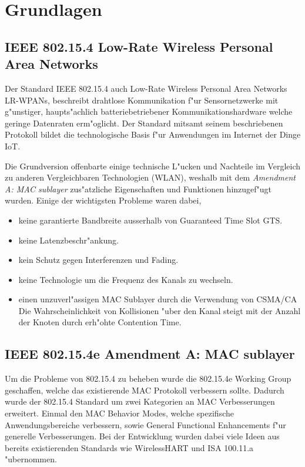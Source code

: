\section{Grundlagen} \label{grundlagen}

\subsection{IEEE 802.15.4 Low-Rate Wireless Personal Area Networks} \label{Kap5-2}

Der Standard IEEE 802.15.4 auch Low-Rate Wireless Personal Area Networks
LR-WPANs, beschreibt drahtlose Kommunikation f"ur Sensornetzwerke mit g"unstiger,
haupts"achlich batteriebetriebener Kommunikationshardware welche geringe Datenraten
erm"oglicht. Der Standard mitsamt seinem beschriebenen Protokoll bildet die
technologische Basis f"ur Anwendungen im Internet der Dinge IoT.

Die Grundversion offenbarte einige technische L"ucken und Nachteile im Vergleich
zu anderen Vergleichbaren Technologien (WLAN), weshalb mit dem \textit{Amendment A: MAC sublayer}
zus"atzliche Eigenschaften und Funktionen hinzugef"ugt wurden. Einige der wichtigsten
Probleme waren dabei,

\begin{itemize}
 \item keine garantierte Bandbreite ausserhalb von Guaranteed Time Slot GTS.
 \item keine Latenzbeschr"ankung.
 \item kein Schutz gegen Interferenzen und Fading.
 \item keine Technologie um die Frequenz des Kanals zu wechseln.
 \item einen unzuverl"assigen MAC Sublayer durch die Verwendung von CSMA/CA
      Die Wahrscheinlichkeit von Kollisionen "uber den Kanal steigt mit
      der Anzahl der Knoten durch erh"ohte Contention Time.
\end{itemize}


\subsection{IEEE 802.15.4e Amendment A: MAC sublayer} \label{Kap5-3}

Um die Probleme von 802.15.4 zu beheben wurde die 802.15.4e Working Group geschaffen,
welche das existierende MAC Protokoll verbessern sollte. Dadurch wurde
der 802.15.4 Standard um zwei Kategorien an MAC Verbesserungen erweitert.
Einmal den MAC Behavior Modes, welche spezifische Anwendungsbereiche verbessern,
sowie General Functional Enhancements f"ur generelle Verbesserungen. Bei der Entwicklung
wurden dabei viele Ideen aus bereits existierenden Standards wie WirelessHART und
ISA 100.11.a "ubernommen.

